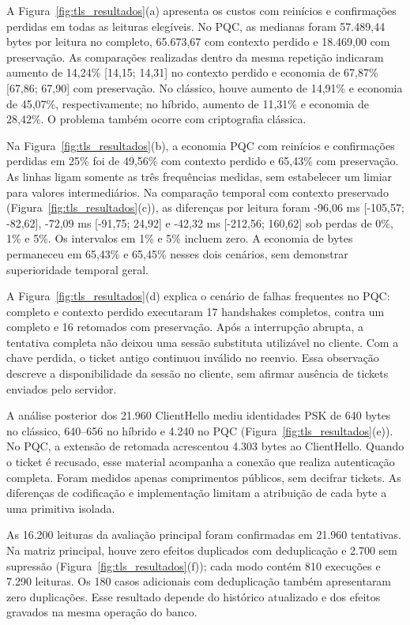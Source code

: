 A Figura~\ref{fig:tls_resultados}(a) apresenta os custos com reinícios e confirmações perdidas em todas as leituras elegíveis. No PQC, as medianas foram 57.489,44 bytes por leitura no completo, 65.673,67 com contexto perdido e 18.469,00 com preservação. As comparações realizadas dentro da mesma repetição indicaram aumento de 14,24\% [14,15; 14,31] no contexto perdido e economia de 67,87\% [67,86; 67,90] com preservação. No clássico, houve aumento de 14,91\% e economia de 45,07\%, respectivamente; no híbrido, aumento de 11,31\% e economia de 28,42\%. O problema também ocorre com criptografia clássica.

Na Figura~\ref{fig:tls_resultados}(b), a economia PQC com reinícios e confirmações perdidas em 25\% foi de 49,56\% com contexto perdido e 65,43\% com preservação. As linhas ligam somente as três frequências medidas, sem estabelecer um limiar para valores intermediários. Na comparação temporal com contexto preservado (Figura~\ref{fig:tls_resultados}(c)), as diferenças por leitura foram -96,06 ms [-105,57; -82,62], -72,09 ms [-91,75; 24,92] e -42,32 ms [-212,56; 160,62] sob perdas de 0\%, 1\% e 5\%. Os intervalos em 1\% e 5\% incluem zero. A economia de bytes permaneceu em 65,43\% e 65,45\% nesses dois cenários, sem demonstrar superioridade temporal geral.

A Figura~\ref{fig:tls_resultados}(d) explica o cenário de falhas frequentes no PQC: completo e contexto perdido executaram 17 handshakes completos, contra um completo e 16 retomados com preservação. Após a interrupção abrupta, a tentativa completa não deixou uma sessão substituta utilizável no cliente. Com a chave perdida, o ticket antigo continuou inválido no reenvio. Essa observação descreve a disponibilidade da sessão no cliente, sem afirmar ausência de tickets enviados pelo servidor.

A análise posterior dos 21.960 ClientHello mediu identidades PSK de 640 bytes no clássico, 640--656 no híbrido e 4.240 no PQC (Figura~\ref{fig:tls_resultados}(e)). No PQC, a extensão de retomada acrescentou 4.303 bytes ao ClientHello. Quando o ticket é recusado, esse material acompanha a conexão que realiza autenticação completa. Foram medidos apenas comprimentos públicos, sem decifrar tickets. As diferenças de codificação e implementação limitam a atribuição de cada byte a uma primitiva isolada.

As 16.200 leituras da avaliação principal foram confirmadas em 21.960 tentativas. Na matriz principal, houve zero efeitos duplicados com deduplicação e 2.700 sem supressão (Figura~\ref{fig:tls_resultados}(f)); cada modo contém 810 execuções e 7.290 leituras. Os 180 casos adicionais com deduplicação também apresentaram zero duplicações. Esse resultado depende do histórico atualizado e dos efeitos gravados na mesma operação do banco.

